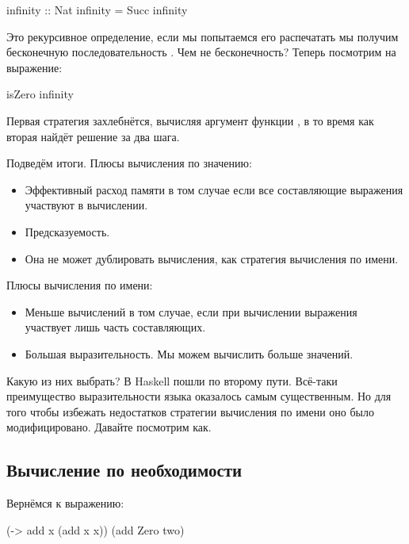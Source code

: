 \begin{code}
infinity    :: Nat
infinity    = Succ infinity
\end{code}

Это рекурсивное определение, если мы попытаемся его распечатать
мы получим бесконечную последовательность . Чем не 
бесконечность? Теперь посмотрим на выражение:

\begin{code}
isZero infinity
\end{code}

Первая стратегия захлебнётся, вычисляя аргумент функции ,
в то время как вторая найдёт решение за два шага. 

Подведём итоги. Плюсы вычисления по значению:

\begin{itemize}
\item Эффективный расход памяти в том случае если все 
        составляющие выражения участвуют в вычислении.

\item Предсказуемость.

\item Она не может дублировать вычисления, как стратегия
        вычисления по имени.
\end{itemize}

Плюсы вычисления по имени:

\begin{itemize}
\item Меньше вычислений в том случае, если при вычислении выражения
    участвует лишь часть составляющих.


\item Большая выразительность. Мы можем вычислить больше значений.
\end{itemize}

Какую из них выбрать? В Haskell пошли по второму пути. Всё-таки
преимущество выразительности языка оказалось самым существенным.
Но для того чтобы избежать недостатков стратегии вычисления по имени
оно было модифицировано. Давайте посмотрим как.

\subsection{Вычисление по необходимости}

Вернёмся к выражению: 

\begin{code}
(\x -> add x (add x x)) (add Zero two)
\end{code}

